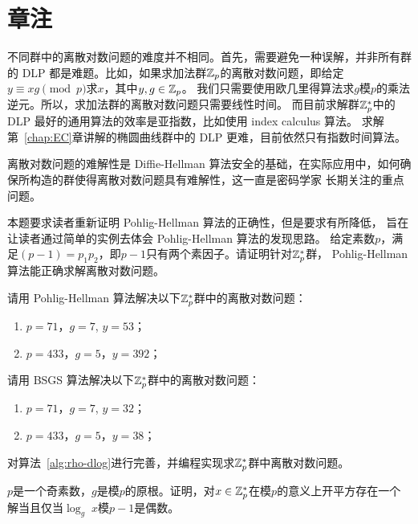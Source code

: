  \section*{章注}
不同群中的离散对数问题的难度并不相同。首先，需要避免一种误解，并非所有群的 DLP 都是难题。比如，如果求加法群${\mathbb Z}_p$的离散对数问题，即给定$y \equiv x g \pmod{p}$求$x$，其中$y, g \in {\mathbb Z}_p$。
我们只需要使用欧几里得算法求$g$模$p$的乘法逆元。所以，求加法群的离散对数问题只需要线性时间。
而目前求解群${\mathbb Z}_p^*$中的 DLP 最好的通用算法的效率是亚指数，比如使用 index calculus 算法。
求解第~\ref{chap:EC}章讲解的椭圆曲线群中的 DLP 更难，目前依然只有指数时间算法。

离散对数问题的难解性是 Diffie-Hellman 算法安全的基础，在实际应用中，如何确保所构造的群使得离散对数问题具有难解性，这一直是密码学家
长期关注的重点问题。

 \begin{problemset}
 \item 本题要求读者重新证明 Pohlig-Hellman 算法的正确性，但是要求有所降低，
 旨在让读者通过简单的实例去体会 Pohlig-Hellman 算法的发现思路。
 给定素数$p$，满足$(p - 1 )= p_1 p_2$，即$p-1$只有两个素因子。请证明针对${\mathbb Z}_p^*$群，
 Pohlig-Hellman 算法能正确求解离散对数问题。
 
 \item 请用 Pohlig-Hellman 算法解决以下${\mathbb Z}_p^*$群中的离散对数问题：
 \begin{enumerate}
 \item $p=71$，$g = 7$, $y = 53$；%
 
 \item $p = 433$，$g = 5$，$y = 392$；%
 \end{enumerate}
 
  \item 请用 BSGS 算法解决以下${\mathbb Z}_p^*$群中的离散对数问题：
  \begin{enumerate}
  \item $p=71$，$g = 7$, $y = 32$；%
  
  \item $p = 433$，$g = 5$，$y = 38$；%
  \end{enumerate}
 
 \item 对算法~\ref{alg:rho-dlog}进行完善，并编程实现求${\mathbb Z}_p^*$群中离散对数问题。
 
 \item $p$是一个奇素数，$g$是模$p$的原根。证明，对$x \in {\mathbb Z}_p^*$在模$p$的意义上开平方存在一个解当且仅当$\log_g \; x$模$p-1$是偶数。
 
 \end{problemset}

